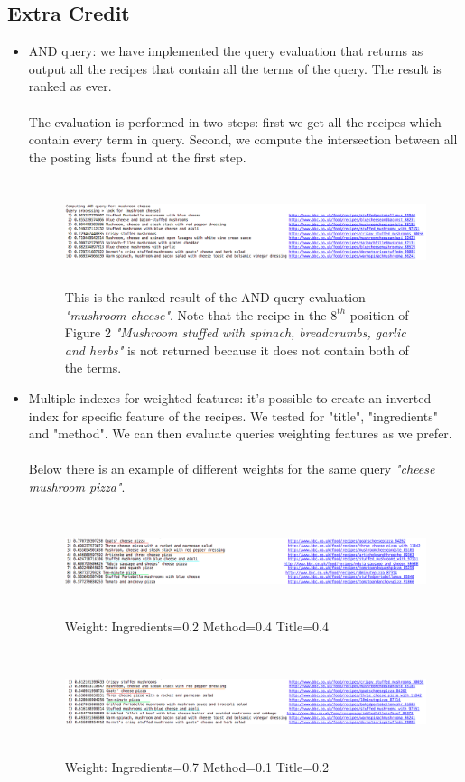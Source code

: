 \documentclass[oneside]{article}			%
\begin{document}
	\subsection{Extra Credit}
	\begin{itemize}
		\item AND query: we have implemented the query evaluation that returns as output all the recipes that contain all the terms of the query. The result is ranked as ever.
		\\\\
		The evaluation is performed in two steps: first we get all the recipes which contain every term in query. Second, we compute the intersection between all the posting lists found at the first step.
		\begin{figure}[h]
			\includegraphics[width=18cm, height=3.1cm]{./report_file/img/4_4_1_ex.png}\caption{This is the ranked result of the AND-query evaluation \textit{"mushroom cheese"}. Note that the recipe in the $8^{th}$ position of Figure 2 \textit{"Mushroom stuffed with spinach, breadcrumbs, garlic and herbs"} is not returned because it does not contain both of the terms.}
		\end{figure}
		\item Multiple indexes for weighted features: it's possible to create an inverted index for specific feature of the recipes. We tested for "title", "ingredients" and "method". We can then evaluate queries weighting features as we prefer.
		\\\\
		Below there is an example of different weights for the same query \textit{"cheese mushroom pizza"}.
		\begin{figure}[h]
			\includegraphics[width=18cm, height=3.1cm]{./report_file/img/4_4_2_ex.png}\caption{Weight: Ingredients=0.2 Method=0.4 Title=0.4}
		\end{figure}
		\begin{figure}[h]
			\includegraphics[width=18cm, height=3.1cm]{./report_file/img/4_4_3_ex.png}\caption{Weight: Ingredients=0.7 Method=0.1 Title=0.2}
		\end{figure}
	\end{itemize}
\end{document}
